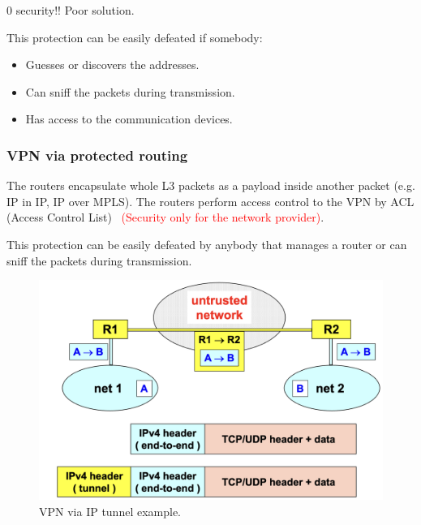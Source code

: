 \begin{tcolorbox}[colback=red!10!white, colframe=red!70!black, coltitle=white, title=Be aware] 
0 security!! Poor solution.
\end{tcolorbox}

This protection can be easily defeated if somebody:
\begin{itemize}
    \item Guesses or discovers the addresses.
    \item Can sniff the packets during transmission.
    \item Has access to the communication devices.
\end{itemize}

\begin{center}
    \subsubsection{VPN via protected routing}
\end{center}

The routers encapsulate whole L3 packets as a payload inside another packet (e.g. IP in IP, IP over MPLS). The routers perform access control to the VPN by ACL (Access Control List) \textrightarrow \ \textcolor{red}{(Security only for the network provider)}.

This protection can be easily defeated by anybody that manages a router or can sniff the packets during transmission.

\begin{figure}[H]
    \includegraphics[width=\linewidth]{Images/NetSec/vpn_via_ip_tunnel.png}
    \caption{VPN via IP tunnel example.}    
\end{figure}

